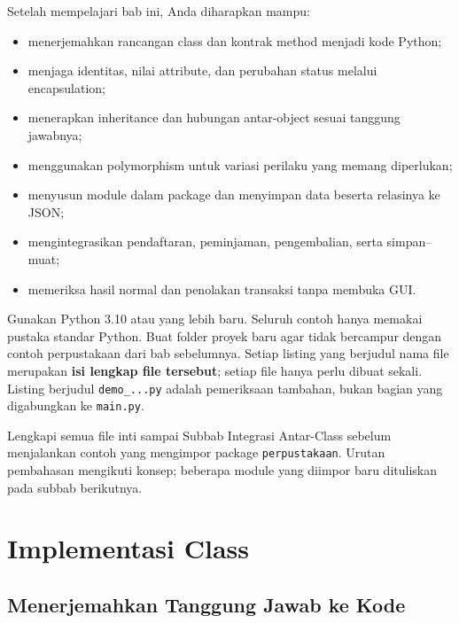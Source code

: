 \begin{info}
Setelah mempelajari bab ini, Anda diharapkan mampu:
\begin{itemize}
  \item menerjemahkan rancangan class dan kontrak method menjadi kode Python;
  \item menjaga identitas, nilai attribute, dan perubahan status melalui encapsulation;
  \item menerapkan inheritance dan hubungan antar-object sesuai tanggung jawabnya;
  \item menggunakan polymorphism untuk variasi perilaku yang memang diperlukan;
  \item menyusun module dalam package dan menyimpan data beserta relasinya ke JSON;
  \item mengintegrasikan pendaftaran, peminjaman, pengembalian, serta simpan--muat;
  \item memeriksa hasil normal dan penolakan transaksi tanpa membuka GUI.
\end{itemize}
\end{info}

\begin{penting}
Gunakan Python 3.10 atau yang lebih baru. Seluruh contoh hanya memakai pustaka standar Python. Buat folder proyek baru agar tidak bercampur dengan contoh perpustakaan dari bab sebelumnya. Setiap listing yang berjudul nama file merupakan \textbf{isi lengkap file tersebut}; setiap file hanya perlu dibuat sekali. Listing berjudul \texttt{demo\_...py} adalah pemeriksaan tambahan, bukan bagian yang digabungkan ke \texttt{main.py}.

Lengkapi semua file inti sampai Subbab Integrasi Antar-Class sebelum menjalankan contoh yang mengimpor package \texttt{perpustakaan}. Urutan pembahasan mengikuti konsep; beberapa module yang diimpor baru dituliskan pada subbab berikutnya.
\end{penting}

\section{Implementasi Class}

\subsection{Menerjemahkan Tanggung Jawab ke Kode}

